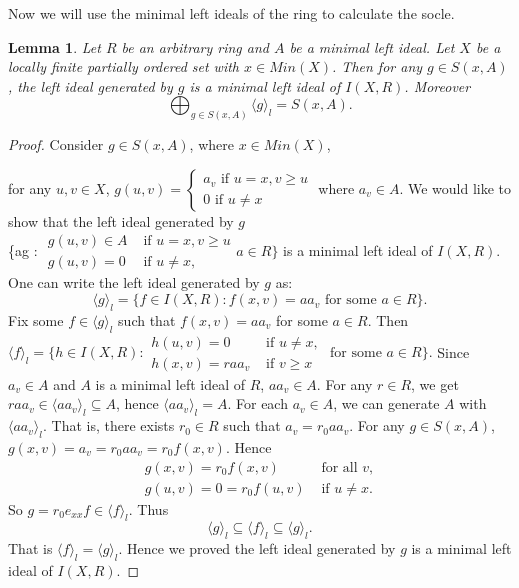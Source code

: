 \documentclass[12pt]{article}
\newtheorem{lemma}[theorem]{Lemma}
\begin{document}
Now we will use the minimal left ideals of the ring to calculate the socle.  
\begin{lemma} \label{minimal}
Let $R$ be an arbitrary ring and $A$ be a minimal left ideal. Let $X$ be a locally finite partially ordered set with $x \in Min(X)$. Then for any $g \in S(x,A)$, the left ideal generated by $g$ is a minimal left ideal of $I(X,R)$. Moreover
\begin{equation*}
\bigoplus_{g \in S(x,A)} \langle g \rangle _l = S(x,A).
\end{equation*}
\end{lemma}
\begin{proof}
Consider $g \in S(x,A)$, where $x \in Min(X)$, 

for any $u,v \in X$, $g(u,v) = 
\begin{cases}
a_{v} \mbox{ if } u=x, v \geq u \\ 
0 \mbox{ if } u \neq x
\end{cases}
$ where $a_v \in A$. We would like to show that the left ideal generated by $g$ 
\\

\{ag : 
$\begin{array}{cl}
g(u,v) \in A & \mbox{ if } u=x, v \geq u \\ 
g(u,v) = 0 & \mbox{ if } u \neq x,%
\end{array}
a \in R \}$	
is a minimal
left ideal of ${I(X,R)}$. 
One can write the left ideal generated by $g$ as:
\begin{equation*}
\langle g \rangle _l=\{f \in I(X,R):f(x,v)=aa_v \mbox { for some }  a \in R \}.
\end{equation*}
Fix some $f \in \langle g \rangle _l$ such that $f(x,v)=aa_v$ for some $a \in R$. Then
$\langle f \rangle _l=\{h \in I(X,R):\begin{array}{cl}
h(u,v) = 0 & \mbox { if } u \neq x, \\ 
h(x,v) = raa_v  & \mbox { if } v \geq x  %
\end{array}
\mbox { for some }  a \in R \}.$ Since $a_v \in A$ and $A$ is a minimal left ideal of $R$, $aa_v \in A$. For any $r \in R$, we get $raa_v \in \langle aa_v \rangle _l \subseteq A$, hence $\langle aa_v \rangle _l=A$. For each $a_v \in A$, we can generate $A$ with $\langle aa_v \rangle _l$. That is, there exists $r_0 \in R$ such that $a_v=r_0aa_v$. For any $g \in S(x,A)$, $g(x,v)=a_v=r_0aa_v=r_0f(x,v)$. Hence
\begin{equation*}
\begin{array}{cl}
g(x,v)=r_0f(x,v) & \mbox{ for all } v, \\ 
g(u,v) = 0 =r_0f(u,v) & \mbox{ if } u \neq x.%
\end{array}
\end{equation*}
So $g = r_0e_{xx}f \in \langle f \rangle _l$. Thus 
\begin{equation*}
\langle g \rangle _l \subseteq \langle f \rangle _l \subseteq \langle g \rangle _l.
\end{equation*}
That is $\langle f \rangle _l= \langle g \rangle _l $. Hence we proved the left ideal generated by $g$ is a minimal
left ideal of ${I(X,R)}$. 
\end{proof}	
\end{document}
